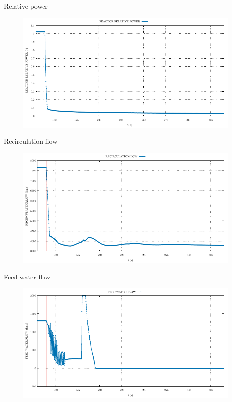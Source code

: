 \begin{frame}{Relative power}
\begin{figure}
	\centering
	\includegraphics[width=\textwidth]{./graphs/REACTOR RELATIVE POWER_comp.pdf}
	
\end{figure}
\end{frame}
\begin{frame}{Recirculation flow}
	\begin{figure}
		\centering
		\includegraphics[width=\textwidth]{./graphs/RECIRCULATION_FLOW_comp.pdf}
		
	\end{figure}

\end{frame}
\begin{frame}{Feed water flow}
	\begin{figure}
		\centering
		\includegraphics[width=\textwidth]{./graphs/FEED WATER FLOW_comp.pdf}
		
	\end{figure}
	
\end{frame}
